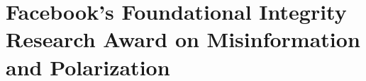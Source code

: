 \section{Facebook's Foundational Integrity Research Award on Misinformation and Polarization}
\label{sec:deep}














